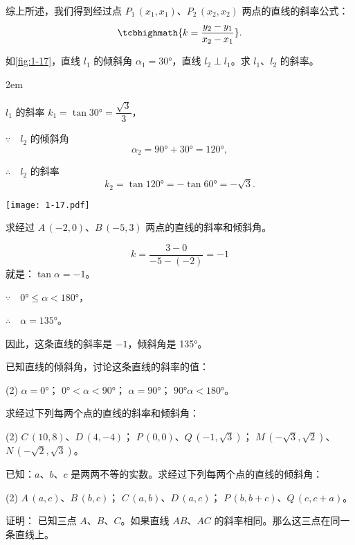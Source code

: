 综上所述，我们得到经过点 $P_1\,(x_1,x_1)$、$P_2\,(x_2,x_2)$ 两点的直线的斜率公式：
\[ \tcbhighmath{k=\frac{y_2-y_1}{x_2-x_1}}. \]
\begin{example}
如\cref{fig:1-17}，直线 $l_1$ 的倾斜角 $\alpha_1=\ang{30}$，直线 $l_2 \perp l_1$。求 $l_1$、$l_2$ 的斜率。
\end{example}
\noindent
\begin{minipage}{0.55\linewidth}\parindent2em
\begin{solution}
  $l_1$ 的斜率 $k_1=\tan\ang{30}=\dfrac{\sqrt{3}}{3}$，

  $\because\quad l_2$ 的倾斜角 
  \[\alpha_2=\ang{90}+\ang{30}=\ang{120},\]

  $\therefore\quad l_2$ 的斜率 
  \[k_2=\tan\ang{120}=-\tan\ang{60}=-\sqrt{3}.\]
\end{solution}
\end{minipage}\hfill
\begin{minipage}{0.4\linewidth}\centering
\begin{figurehere}
    \texttt{[image: 1-17.pdf]}
    \caption{}\label{fig:1-17}
\end{figurehere}
\end{minipage}
\begin{example}
求经过 $A\,(-2,0)$、$B\,(-5,3)$ 两点的直线的斜率和倾斜角。
\end{example}
\begin{solution}
\[ k=\frac{3-0}{-5-(-2)}=-1\]
就是：$\tan \alpha=-1$。

$\because\quad \ang{0}\leqslant\alpha<\ang{180}$，

$\therefore\quad \alpha=\ang{135}$。

因此，这条直线的斜率是 $-1$，倾斜角是 \ang{135}。
\end{solution}

\begin{Practice}
  \begin{question}
    \item 已知直线的倾斜角，讨论这条直线的斜率的值：
    \begin{tasks}(2)
      \task $\alpha=\ang{0}$；
      \task $\ang{0}<\alpha<\ang{90}$；
      \task $\alpha=\ang{90}$；
      \task $\ang{90}\alpha<\ang{180}$。
    \end{tasks}
    \item 求经过下列每两个点的直线的斜率和倾斜角：
    \begin{tasks}(2)
      \task $C\,(10,8)$、$D\,(4,-4)$；
      \task $P\,(0,0)$、$Q\,(-1,\sqrt{3})$；
      \task $M\,(-\sqrt{3},\sqrt{2})$、$N\,(-\sqrt{2},\sqrt{3})$。
    \end{tasks}
    \item 已知：$a$、$b$、$c$ 是两两不等的实数。求经过下列每两个点的直线的倾斜角：
    \begin{tasks}(2)
      \task $A\,(a,c)$、$B\,(b,c)$；
      \task $C\,(a,b)$、$D\,(a,c)$；
      \task $P\,(b,b+c)$、$Q\,(c,c+a)$。
    \end{tasks}
    \item 证明： 已知三点 $A$、$B$、$C$。如果直线 $AB$、$AC$ 的斜率相同。那么这三点在同一条直线上。
  \end{question}
\end{Practice}

